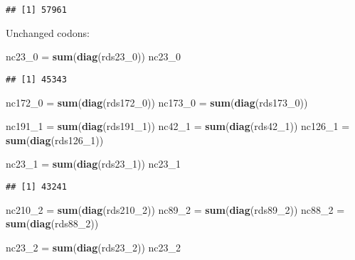 \documentclass[
]{article}
\newenvironment{Shaded}{\begin{snugshade}}{\end{snugshade}}
\newcommand{\DecValTok}[1]{\textcolor[rgb]{0.00,0.00,0.81}{#1}}
\newcommand{\KeywordTok}[1]{\textcolor[rgb]{0.13,0.29,0.53}{\textbf{#1}}}
\newcommand{\NormalTok}[1]{#1}
\newcommand{\StringTok}[1]{\textcolor[rgb]{0.31,0.60,0.02}{#1}}
\begin{document}
\begin{verbatim}
## [1] 57961
\end{verbatim}

Unchanged codons:

\begin{Shaded}
\begin{Highlighting}[]
\NormalTok{nc23_}\DecValTok{0}\NormalTok{ =}\StringTok{ }\KeywordTok{sum}\NormalTok{(}\KeywordTok{diag}\NormalTok{(rds23_}\DecValTok{0}\NormalTok{))}
\NormalTok{nc23_}\DecValTok{0}
\end{Highlighting}
\end{Shaded}

\begin{verbatim}
## [1] 45343
\end{verbatim}

\begin{Shaded}
\begin{Highlighting}[]
\NormalTok{nc172_}\DecValTok{0}\NormalTok{ =}\StringTok{ }\KeywordTok{sum}\NormalTok{(}\KeywordTok{diag}\NormalTok{(rds172_}\DecValTok{0}\NormalTok{))}
\NormalTok{nc173_}\DecValTok{0}\NormalTok{ =}\StringTok{ }\KeywordTok{sum}\NormalTok{(}\KeywordTok{diag}\NormalTok{(rds173_}\DecValTok{0}\NormalTok{))}

\NormalTok{nc191_}\DecValTok{1}\NormalTok{ =}\StringTok{ }\KeywordTok{sum}\NormalTok{(}\KeywordTok{diag}\NormalTok{(rds191_}\DecValTok{1}\NormalTok{))}
\NormalTok{nc42_}\DecValTok{1}\NormalTok{ =}\StringTok{ }\KeywordTok{sum}\NormalTok{(}\KeywordTok{diag}\NormalTok{(rds42_}\DecValTok{1}\NormalTok{))}
\NormalTok{nc126_}\DecValTok{1}\NormalTok{ =}\StringTok{ }\KeywordTok{sum}\NormalTok{(}\KeywordTok{diag}\NormalTok{(rds126_}\DecValTok{1}\NormalTok{))}

\NormalTok{nc23_}\DecValTok{1}\NormalTok{ =}\StringTok{ }\KeywordTok{sum}\NormalTok{(}\KeywordTok{diag}\NormalTok{(rds23_}\DecValTok{1}\NormalTok{))}
\NormalTok{nc23_}\DecValTok{1}
\end{Highlighting}
\end{Shaded}

\begin{verbatim}
## [1] 43241
\end{verbatim}

\begin{Shaded}
\begin{Highlighting}[]
\NormalTok{nc210_}\DecValTok{2}\NormalTok{ =}\StringTok{ }\KeywordTok{sum}\NormalTok{(}\KeywordTok{diag}\NormalTok{(rds210_}\DecValTok{2}\NormalTok{))}
\NormalTok{nc89_}\DecValTok{2}\NormalTok{ =}\StringTok{ }\KeywordTok{sum}\NormalTok{(}\KeywordTok{diag}\NormalTok{(rds89_}\DecValTok{2}\NormalTok{))}
\NormalTok{nc88_}\DecValTok{2}\NormalTok{ =}\StringTok{ }\KeywordTok{sum}\NormalTok{(}\KeywordTok{diag}\NormalTok{(rds88_}\DecValTok{2}\NormalTok{))}

\NormalTok{nc23_}\DecValTok{2}\NormalTok{ =}\StringTok{ }\KeywordTok{sum}\NormalTok{(}\KeywordTok{diag}\NormalTok{(rds23_}\DecValTok{2}\NormalTok{))}
\NormalTok{nc23_}\DecValTok{2}
\end{Highlighting}
\end{Shaded}
\end{document}
